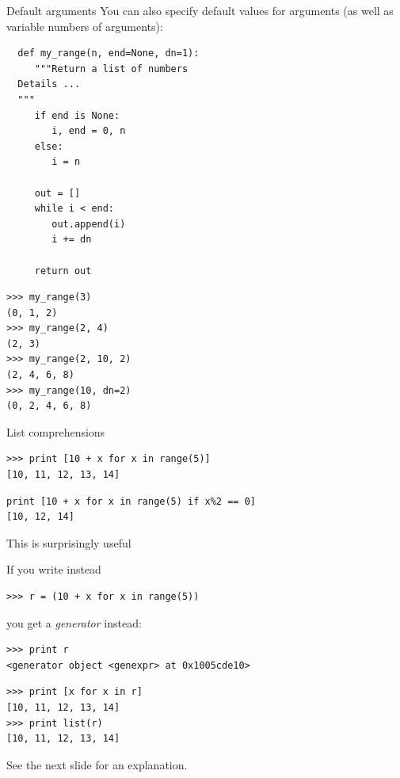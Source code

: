 \documentclass[10pt, t]{beamer}
\begin{document}
\begin{frame}[fragile,label=sec-2-15]{Default arguments}
 You can also specify default values for arguments (as well as variable numbers of arguments):
\lstset{language=Python,label= ,caption= ,numbers=none}
\begin{lstlisting}
  def my_range(n, end=None, dn=1):
     """Return a list of numbers 
  Details ...
  """
     if end is None:
        i, end = 0, n
     else:
        i = n
    
     out = []
     while i < end:
        out.append(i)
        i += dn
    
     return out
\end{lstlisting}
\pause
\lstset{language=Python,label= ,caption= ,numbers=none}
\begin{lstlisting}
>>> my_range(3)
(0, 1, 2)
>>> my_range(2, 4)
(2, 3)
>>> my_range(2, 10, 2)
(2, 4, 6, 8)
>>> my_range(10, dn=2)
(0, 2, 4, 6, 8)
\end{lstlisting}
\end{frame}
\begin{frame}[fragile,label=sec-2-16]{List comprehensions}
 \lstset{language=Python,label= ,caption= ,numbers=none}
\begin{lstlisting}
>>> print [10 + x for x in range(5)]
[10, 11, 12, 13, 14]
\end{lstlisting}

\pause
\lstset{language=Python,label= ,caption= ,numbers=none}
\begin{lstlisting}
print [10 + x for x in range(5) if x%2 == 0]
[10, 12, 14]
\end{lstlisting}
\pause

This is surprisingly useful
\pause

If you write instead
\lstset{language=Python,label= ,caption= ,numbers=none}
\begin{lstlisting}
>>> r = (10 + x for x in range(5))
\end{lstlisting}
you get a \emph{generator} instead:
\lstset{language=Python,label= ,caption= ,numbers=none}
\begin{lstlisting}
>>> print r
<generator object <genexpr> at 0x1005cde10>
\end{lstlisting}
\pause
\lstset{language=Python,label= ,caption= ,numbers=none}
\begin{lstlisting}
>>> print [x for x in r]
[10, 11, 12, 13, 14]
>>> print list(r)
[10, 11, 12, 13, 14]
\end{lstlisting}
See the next slide for an explanation.
\end{frame}
\end{document}
